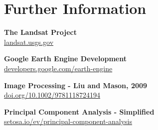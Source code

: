 \documentclass[12pt]{article}
\begin{document}
\section{Further Information}

{

\textbf{The Landsat Project}\\
\href{https://landsat.usgs.gov/}{landsat.usgs.gov}

\textbf{Google Earth Engine Development}\\
\href{https://developers.google.com/earth-engine/}{developers.google.com/earth-engine}

\textbf{Image Processing - Liu and Mason, 2009}\\
\href{https://doi.org/10.1002/9781118724194}{doi.org/10.1002/9781118724194}

\textbf{Principal Component Analysis - Simplified}\\
\href{http://setosa.io/ev/principal-component-analysis/}{setosa.io/ev/principal-component-analysis}
}

\begin{footnotesize}
\singlespacing


\end{footnotesize}
\end{document}
